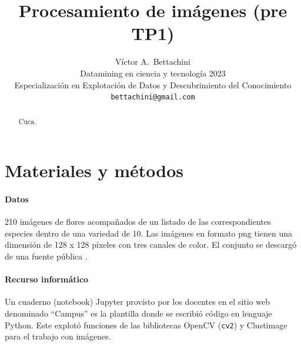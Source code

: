 \documentclass{article}
\title{Procesamiento de imágenes (pre TP1)}
\author{
  Víctor A.~Bettachini\\ %
  Datamining en ciencia y tecnología 2023\\
  Especialización en Explotación de Datos y Descubrimiento del Conocimiento\\
  \texttt{bettachini@gmail.com}
}
\begin{document}
\maketitle


\begin{abstract}
Cuca.
\end{abstract}





\section{Materiales y métodos}

\paragraph{Datos}
210 imágenes de flores acompañados de un listado de las correspondientes especies dentro de una variedad de 10.
Las imágenes en formato png tienen una dimensión de 128 x 128 píxeles con tres canales de color.
El conjunto se descargó de una fuente pública \cite{belitskaya_flower_2020}.


\paragraph{Recurso informático} 
Un cuaderno (notebook) Jupyter provisto por los docentes en el sitio web denominado ``Campus'' \cite{kamienkowski_curso_2023} es la plantilla donde se escribió código en lenguaje Python.
Este explotó funciones de las bibliotecas OpenCV (\verb'cv2') y Clustimage para el trabajo con imágenes.
\end{document}
